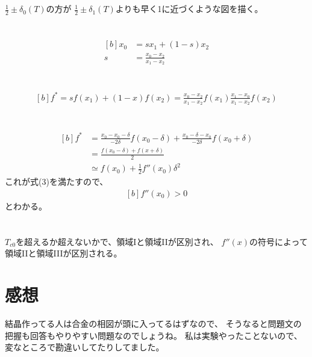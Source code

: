 \documentclass[../ap_2022.tex]{subfiles}
\begin{document}
\section{}
\(\frac{1}{2}\pm\delta_0(T)\)の方が
\(\frac{1}{2}\pm\delta_1(T)\)よりも早く1に近づくような図を描く。

\section{}
\begin{equation}\begin{aligned}[b]
    x_0 &= sx_1+(1-s)x_2\\
    s &= \frac{x_0-x_2}{x_1-x_2}
\end{aligned}\end{equation}

\section{}
\begin{equation}\begin{aligned}[b]
    f^* = sf(x_1)+(1-x)f(x_2) = \frac{x_0-x_2}{x_1-x_2}f(x_1)\frac{x_1-x_0}{x_1-x_2}f(x_2)
\end{aligned}\end{equation}

\section{}
\begin{equation}\begin{aligned}[b]
    f^* &= \frac{x_0-x_0-\delta}{-2\delta}f(x_0-\delta)+\frac{x_0-\delta-x_0}{-2\delta}f(x_0+\delta)\\
    &=\frac{f(x_0-\delta)+f(x+\delta)}{2} \\
    &\simeq f(x_0)+\frac{1}{2}f''(x_0)\delta ^2
\end{aligned}\end{equation}
これが式(3)を満たすので、
\begin{equation}\begin{aligned}[b]
    f''(x_0)>0
\end{aligned}\end{equation}
とわかる。

\section{}
\(T_{c0}\)を超えるか超えないかで、領域Iと領域IIが区別され、
\(f''(x)\)の符号によって領域IIと領域IIIが区別される。

\section*{感想}
結晶作ってる人は合金の相図が頭に入ってるはずなので、
そうなると問題文の把握も回答もやりやすい問題なのでしょうね。
私は実験やったことないので、変なところで勘違いしてたりしてました。
\end{document}
